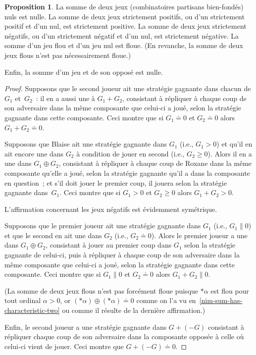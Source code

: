 \documentclass[12pt,a4paper]{article}
\theoremstyle{definition}
\newtheorem{prop}[comcnt]{Proposition}
\newcommand{\fuzzy}{\mathrel{\|}}
\begin{document}
\begin{prop}\label{basic-facts-on-sum-of-partizan-games}
La somme de deux jeux (combinatoires partisans bien-fondés) nuls est
nulle.  La somme de deux jeux strictement positifs, ou d'un
strictement positif et d'un nul, est strictement positive.  La somme
de deux jeux strictement négatifs, ou d'un strictement négatif et d'un
nul, est strictement négative.  La somme d'un jeu flou et d'un jeu nul
est floue.  (En revanche, la somme de deux jeux flous n'est pas
nécessairement floue.)

Enfin, la somme d'un jeu et de son opposé est nulle.
\end{prop}
\begin{proof}
Supposons que le second joueur ait une stratégie gagnante dans chacun
de $G_1$ et $G_2$ : il en a aussi une à $G_1 + G_2$, consistant à
répliquer à chaque coup de son adversaire dans la même composante que
celui-ci a joué, selon la stratégie gagnante dans cette composante.
Ceci montre que si $G_1 \doteq 0$ et $G_2 \doteq 0$ alors $G_1 + G_2
\doteq 0$.

Supposons que Blaise ait une stratégie gagnante dans $G_1$ (i.e., $G_1
> 0$) et qu'il en ait encore une dans $G_2$ à condition de jouer en
second (i.e., $G_2 \geq 0$).  Alors il en a une dans $G_1 \oplus G_2$,
consistant à répliquer à chaque coup de Roxane dans la même composante
qu'elle a joué, selon la stratégie gagnante qu'il a dans la composante
en question ; et s'il doit jouer le premier coup, il jouera selon la
stratégie gagnante dans $G_1$.  Ceci montre que si $G_1 > 0$ et $G_2
\geq 0$ alors $G_1 + G_2 > 0$.

L'affirmation concernant les jeux négatifs est évidemment symétrique.

Supposons que le premier joueur ait une stratégie gagnante dans $G_1$
(i.e., $G_1 \fuzzy 0$) et que le second en ait une dans $G_2$ (i.e.,
$G_2 \doteq 0$).  Alors le premier joueur a une dans $G_1 \oplus G_2$,
consistant à jouer au premier coup dans $G_1$ selon la stratégie
gagnante de celui-ci, puis à répliquer à chaque coup de son adversaire
dans la même composante que celui-ci a joué, selon la stratégie
gagnante dans cette composante.  Ceci montre que si $G_1 \fuzzy 0$ et
$G_2 \doteq 0$ alors $G_1 + G_2 \fuzzy 0$.

(La somme de deux jeux flous n'est pas forcément floue puisque
$*\alpha$ est flou pour tout ordinal $\alpha>0$, or
$(*\alpha)\oplus(*\alpha) \doteq 0$ comme on l'a vu
en \ref{nim-sum-has-characteristic-two} ou comme il résulte de la
dernière affirmation.)

Enfin, le second joueur a une stratégie gagnante dans $G + (-G)$
consistant à répliquer chaque coup de son adversaire dans la
composante opposée à celle où celui-ci vient de jouer.  Ceci montre
que $G + (-G) \doteq 0$.
\end{proof}
\end{document}
